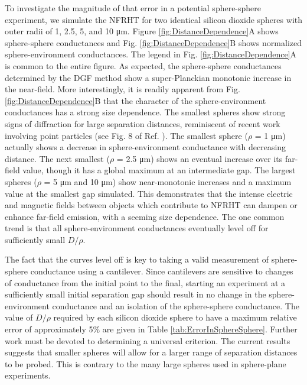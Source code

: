 To investigate the magnitude of that error in a potential sphere-sphere experiment, we simulate the NFRHT for two identical silicon dioxide spheres with outer radii of 1, 2.5, 5, and 10 \si{\micro\meter}. Figure \ref{fig:DistanceDependence}A shows sphere-sphere conductances and Fig. \ref{fig:DistanceDependence}B shows normalized sphere-environment conductances. The legend in Fig. \ref{fig:DistanceDependence}A is common to the entire figure. As expected, the sphere-sphere conductances determined by the DGF method show a super-Planckian monotonic increase in the near-field. More interestingly, it is readily apparent from Fig. \ref{fig:DistanceDependence}B that the character of the sphere-environment conductances has a strong size dependence. The smallest spheres show strong signs of diffraction for large separation distances, reminiscent of recent work involving point particles (see Fig. 8 of Ref. ). The smallest sphere ($\rho$ = 1 \si{\micro\meter}) actually shows a decrease in sphere-environment conductance with decreasing distance. The next smallest ($\rho$ = 2.5 \si{\micro\meter}) shows an eventual increase over its far-field value, though it has a global maximum at an intermediate gap. The largest spheres ($\rho$ = 5 \si{\micro\meter} and 10 \si{\micro\meter}) show near-monotonic increases and a maximum value at the smallest gap simulated. This demonstrates that the intense electric and magnetic fields between objects which contribute to NFRHT can dampen or enhance far-field emission, with a seeming size dependence. The one common trend is that all sphere-environment conductances eventually level off for sufficiently small $D/\rho$.

The fact that the curves level off is key to taking a valid measurement of sphere-sphere conductance using a cantilever. Since cantilevers are sensitive to changes of conductance from the initial point to the final, starting an experiment at a sufficiently small initial separation gap should result in no change in the sphere-environment conductance and an isolation of the sphere-sphere conductance. The value of $D/\rho$ required by each silicon dioxide sphere to have a maximum relative error of approximately 5\% are given in Table \ref{tab:ErrorInSphereSphere}. Further work must be devoted to determining a universal criterion. The current results suggests that smaller spheres will allow for a larger range of separation distances to be probed. This is contrary to the many large spheres used in sphere-plane experiments.\cite{Rousseau2009,Shen2009}

